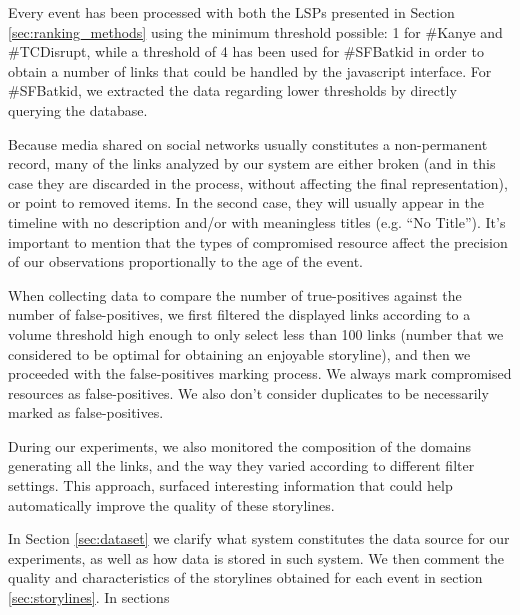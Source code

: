\documentclass{sig-alternate}
\begin{document}
Every event has been processed with both the LSPs presented in Section \ref{sec:ranking_methods} using the minimum threshold possible: 1 for \#Kanye and \#TCDisrupt, while a threshold of 4 has been used for \#SFBatkid in order to obtain a number of links that could be handled by the javascript interface. For \#SFBatkid, we extracted the data regarding lower thresholds by directly querying the database.

Because media shared on social networks usually constitutes a non-permanent record, many of the links analyzed by our system are either broken (and in this case they are discarded in the process, without affecting the final representation), or point to removed items. In the second case, they will usually appear in the timeline with no description and/or with meaningless titles (e.g. ``No Title''). It's important to mention that the types of compromised resource affect the precision of our observations proportionally to the age of the event.

When collecting data to compare the number of true-positives against the number of false-positives, we first filtered the displayed links according to a volume threshold high enough to only select less than 100 links (number that we considered to be optimal for obtaining an enjoyable storyline), and then we proceeded with the false-positives marking process. We always mark compromised resources as false-positives. We also don't consider duplicates to be necessarily marked as false-positives.

During our experiments, we also monitored the composition of the domains generating all the links, and the way they varied according to different filter settings. This approach, surfaced interesting information that could help automatically improve the quality of these storylines.

In Section \ref{sec:dataset} we clarify what system constitutes the data source for our experiments, as well as how data is stored in such system. We then comment the quality and characteristics of the storylines obtained for each event in section \ref{sec:storylines}. In sections 
\end{document}
